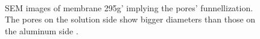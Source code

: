 \documentclass[../thesis.tex]{subfiles}
\begin{document}
        \begin{figure}[p]
          \centering
          \\
          \caption{SEM images of membrane 295g' implying the pores' funnellization. The pores on the solution side \protect{} show bigger diameters than those on the aluminum side \protect{}.}
          \label{fig:295g-sem-funnellization-proof}
        \end{figure}
\end{document}
